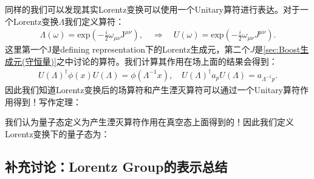 同样的我们可以发现其实Lorentz变换可以使用一个Unitary算符进行表达。对于一个Lorentz变换$ \Lambda $我们定义算符：
\begin{align}
  \Lambda(\omega) =
  \text{exp}\left(-\frac{i}{2}\omega_{\mu\nu}\mathrm{J}^{\mu\nu}\right),
  \quad \Rightarrow \quad U(\omega) =
  \text{exp}\left(-\frac{i}{2}\omega_{\mu\nu}J^{\mu\nu}\right).
\end{align}
这里第一个$ \mathrm{J} $是defining representation下的Lorentz生成元，第二个$ J
$是\cref{sec:Boost生成元(守恒量)}之中讨论的算符。我们计算其作用在场上面的结果会得到：
\begin{align}
  U(\Lambda)^{\dagger}\phi(x)U(\Lambda) = \phi(\Lambda^{-1}x), \quad
  U(\Lambda)^{\dagger}a_p U(\Lambda) = a_{\Lambda^{-1}p}.
\end{align}
因此我们知道Lorentz变换后的场算符和产生湮灭算符可以通过一个Unitary算符作用得到！写作定理：

\bigskip
{}

我们认为量子态定义为产生湮灭算符作用在真空态上面得到的！因此我们定义Lorentz变换下的量子态为：

\subsection{补充讨论：Lorentz Group的表示总结}

